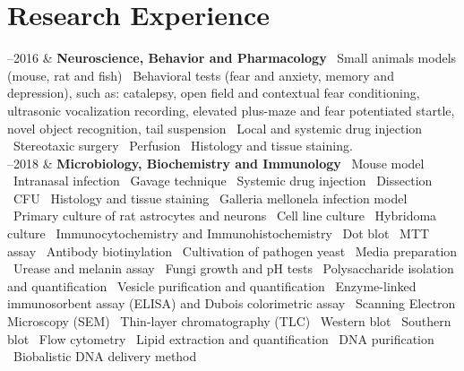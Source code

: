 \documentclass[11pt, a4paper]{article}
\newcommand{\Duration}[2]{\fontsize{10pt}{0}\selectfont #1--#2}
\begin{document}
\section*{Research Experience}

\begin{EntriesTable}
	
	\Duration{2010}{2016}  &
	\textbf{Neuroscience, Behavior and Pharmacology}
	\newline
	 \textbullet \ Small animals models (mouse, rat and fish) \textbullet \ Behavioral tests (fear and anxiety, memory and depression), such as: catalepsy, open field and contextual fear conditioning, ultrasonic vocalization recording, elevated plus-maze and fear potentiated startle, novel object recognition, tail suspension \textbullet \ Local and systemic drug injection \textbullet \ Stereotaxic surgery \textbullet \ Perfusion \textbullet \ Histology and tissue staining.
	\\
	
	\Duration{2014}{2018}  &
	\textbf{Microbiology, Biochemistry and Immunology}
	\newline
	\textbullet \ Mouse model \textbullet \ Intranasal infection \textbullet \ Gavage technique \textbullet \ Systemic drug injection \textbullet \ Dissection \textbullet \ CFU \textbullet \ Histology and tissue staining \textbullet \ Galleria mellonela infection model \textbullet \ Primary culture of rat astrocytes and neurons \textbullet \ Cell line culture \textbullet \ Hybridoma culture \textbullet \ Immunocytochemistry and Immunohistochemistry \textbullet \ Dot blot \textbullet \ MTT assay \textbullet \ Antibody biotinylation \textbullet \ Cultivation of pathogen yeast \textbullet \ Media preparation \textbullet \ Urease and melanin assay \textbullet \ Fungi growth and pH tests \textbullet \ Polysaccharide isolation and quantification \textbullet \ Vesicle purification and quantification \textbullet \ Enzyme-linked immunosorbent assay (ELISA) and Dubois colorimetric assay  \textbullet \ Scanning Electron Microscopy (SEM)  \textbullet \ Thin-layer chromatography (TLC) \textbullet \ Western blot \textbullet \ Southern blot \textbullet \ Flow cytometry \textbullet \ Lipid extraction and quantification \textbullet \ DNA purification  \textbullet \ Biobalistic DNA delivery method 
	\\

	
\end{EntriesTable}
\end{document}
